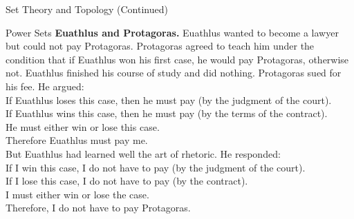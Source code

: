 \documentclass[11pt]{article}
\theoremstyle{definition}
\begin{document}
\begin{section}{Set Theory and Topology (Continued)}
\begin{subsection}{Power Sets}
\noindent \textbf{Euathlus and Protagoras.} Euathlus wanted to become a lawyer but could not pay Protagoras. Protagoras agreed to teach him under the condition that if Euathlus won his first case, he would pay Protagoras, otherwise not. Euathlus finished his course of study and did nothing. Protagoras sued for his fee. He argued:\\

\noindent If Euathlus loses this case, then he must pay (by the judgment of the court).\\
If Euathlus wins this case, then he must pay (by the terms of the contract).\\
He must either win or lose this case.\\
Therefore Euathlus must pay me.\\

\noindent But Euathlus had learned well the art of rhetoric. He responded:\\

\noindent If I win this case, I do not have to pay (by the judgment of the court).\\
If I lose this case, I do not have to pay (by the contract).\\
I must either win or lose the case.\\
Therefore, I do not have to pay Protagoras.

\end{subsection}

\end{section}
\end{document}
